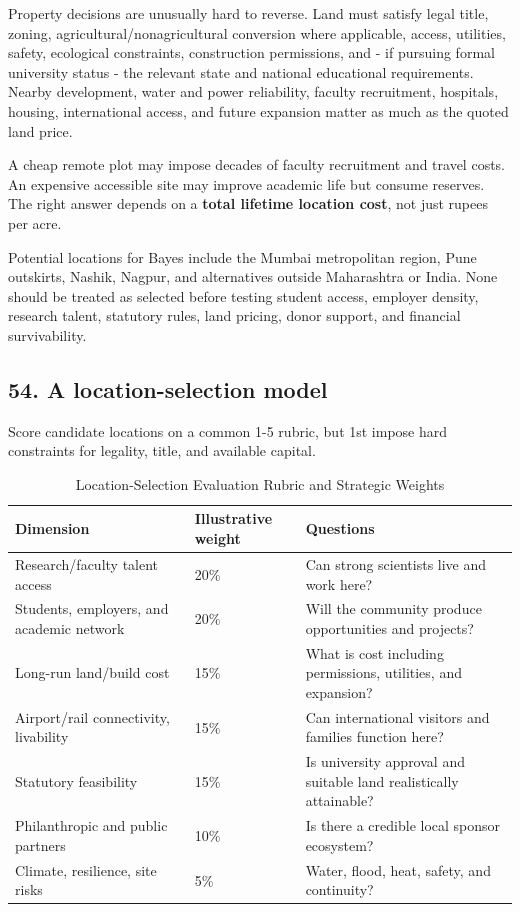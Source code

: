 Property decisions are unusually hard to reverse. Land must satisfy legal title, zoning, agricultural/\allowbreak nonagricultural conversion where applicable, access, utilities, safety, ecological constraints, construction permissions, and - if pursuing formal university status - the relevant state and national educational requirements. Nearby development, water and power reliability, faculty recruitment, hospitals, housing, international access, and future expansion matter as much as the quoted land price.

A cheap remote plot may impose decades of faculty recruitment and travel costs. An expensive accessible site may improve academic life but consume reserves. The right answer depends on a \textbf{total lifetime location cost}, not just rupees per acre.

Potential locations for Bayes include the Mumbai metropolitan region, Pune outskirts, Nashik, Nagpur, and alternatives outside Maharashtra or India. None should be treated as selected before testing student access, employer density, research talent, statutory rules, land pricing, donor support, and financial survivability.

\subsection{54. A location-selection model}

Score candidate locations on a common 1-5 rubric, but 1st impose hard constraints for legality, title, and available capital.

\begin{table}[t]
\centering
\small
\caption{Location-Selection Evaluation Rubric and Strategic Weights}
\label{tab:ch36_location_model}
\begin{tabularx}{\textwidth}{p{4.2cm} p{2.2cm} X}
\toprule
\textbf{ Dimension } & \textbf{ Illustrative weight } & \textbf{ Questions } \\
\midrule
 Research/\allowbreak faculty talent access  &  20\%  &  Can strong scientists live and work here?  \\
 Students, employers, and academic network  &  20\%  &  Will the community produce opportunities and projects?  \\
 Long-run land/\allowbreak build cost  &  15\%  &  What is cost including permissions, utilities, and expansion?  \\
 Airport/\allowbreak rail connectivity, livability  &  15\%  &  Can international visitors and families function here?  \\
 Statutory feasibility  &  15\%  &  Is university approval and suitable land realistically attainable?  \\
 Philanthropic and public partners  &  10\%  &  Is there a credible local sponsor ecosystem?  \\
 Climate, resilience, site risks  &  5\%  &  Water, flood, heat, safety, and continuity?  \\
\bottomrule
\end{tabularx}
\end{table}

